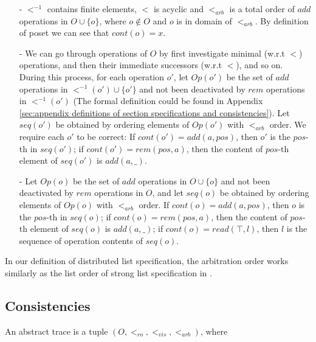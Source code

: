 \begin{itemize}
\setlength{\itemsep}{0.5pt}
\item[-] $<^{-1}$ contains finite elements, $<$ is acyclic and $<_{\textit{arb}}$ is a total order of $add$ operations in $O \cup \{ o \}$, where $o \notin O$ and $o$ is in domain of $<_{\textit{arb}}$. By definition of poset we can see that $cont(o)=x$. 
    
\item[-] We can go through operations of $O$ by first investigate minimal (w.r.t $<$) operations, and then their immediate successors (w.r.t $<$), and so on. During this process, for each operation $o'$, let $Op(o')$ be the set of $add$ operations in $<^{-1}(o') \cup \{ o' \}$ and not been deactivated by $rem$ operations in $<^{-1}(o')$ (The formal definition could be found in Appendix \ref{sec:appendix definitions of section specifications and consistencies}). Let $seq(o')$ be obtained by ordering elements of $Op(o')$ with $<_{\textit{arb}}$ order. We require each $o'$ to be correct: If $cont(o')=add(a,pos)$, then $o'$ is the $pos$-th in $seq(o')$; if $cont(o')=rem(pos,a)$, then the content of $pos$-th element of $seq(o')$ is $add(a,\_)$.

\item[-] {\color {red}Let $Op(o)$ be the set of $add$ operations in $O \cup \{ o \}$ and not been deactivated by $rem$ operations in $O$, and let $seq(o)$ be obtained by ordering elements of $Op(o)$ with $<_{\textit{arb}}$ order.} If $cont(o)=add(a,pos)$, then $o$ is the $pos$-th in $seq(o)$; if $cont(o)=rem(pos,a)$, then the content of $pos$-th element of $seq(o)$ is $add(a,\_)$; if $cont(o)=read(\top,l)$, then $l$ is the sequence of operation contents of $seq(o)$.
\end{itemize}

In our definition of distributed list specification, the arbitration order works similarly as the list order of strong list specification in \cite{Attiya:2016}. 





\subsection{Consistencies}
\label{subsec:consistencies} 

An abstract trace is a tuple $(O,<_{\textit{ro}},<_{\textit{vis}},<_{\textit{arb}})$, where 


